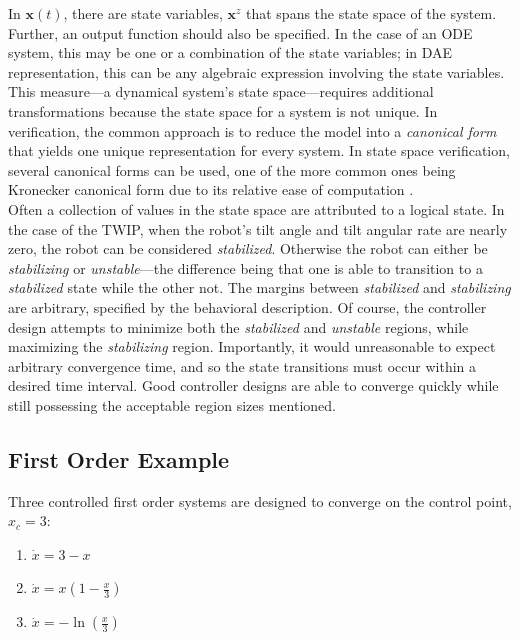 In $\bm{x}(t)$, there are state variables, $\bm{x}^z$ that spans the state space of the system. Further, an output function should also be specified. In the case of an ODE system, this may be one or a combination of the state variables; in DAE representation, this can be any algebraic expression involving the state variables. This measure---a dynamical system's state space---requires additional transformations because the state space for a system is not unique. In verification, the common approach is to reduce the model into a \textit{canonical form} that yields one unique representation for every system. In state space verification, several canonical forms can be used, one of the more common ones being Kronecker canonical form due to its relative ease of computation \cite{marz1992numerical}. \\

Often a collection of values in the state space are attributed to a logical state. In the case of the TWIP, when the robot's tilt angle and tilt angular rate are nearly zero, the robot can be considered \textit{stabilized}. Otherwise the robot can either be \textit{stabilizing} or \textit{unstable}---the difference being that one is able to transition to a \textit{stabilized} state while the other not. The margins between \textit{stabilized} and \textit{stabilizing} are arbitrary, specified by the behavioral description. Of course, the controller design attempts to minimize both the \textit{stabilized} and \textit{unstable} regions, while maximizing the \textit{stabilizing} region. Importantly, it would unreasonable to expect arbitrary convergence time, and so the state transitions must occur within a desired time interval. Good controller designs are able to converge quickly while still possessing the acceptable region sizes mentioned.   

\subsection{First Order Example}
Three controlled first order systems are designed to converge on the control point, $x_c = 3$:

\begin{enumerate}
    \item $\dot{x} = 3-x$
    \item $\dot{x} = x \left( 1 - \frac{x}{3} \right)$
    \item $\dot{x} = - \ln\left( \frac{x}{3} \right)$
\end{enumerate}


